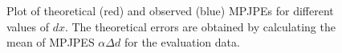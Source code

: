 \begin{figure}[ht]
	
	\caption{Plot of theoretical (red) and observed (blue) MPJPEs for different values of $dx$. 
		The theoretical errors are obtained by calculating the mean of MPJPES $\alpha \Delta d$ for the evaluation data.}
	\label{fig:x-shift-error}
\end{figure}